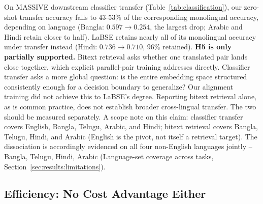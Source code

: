 \documentclass[manuscript]{acmart}
\begin{document}
On MASSIVE downstream classifier transfer (Table~\ref{tab:classification}), our zero-shot transfer accuracy falls to 43-53\% of the corresponding monolingual accuracy, depending on language (Bangla: $0.597\to0.254$, the largest drop; Arabic and Hindi retain closer to half). LaBSE retains nearly all of its monolingual accuracy under transfer instead (Hindi: $0.736\to0.710$, 96\% retained). \textbf{H5 is only partially supported.} Bitext retrieval asks whether one translated pair lands close together, which explicit parallel-pair training addresses directly. Classifier transfer asks a more global question: is the entire embedding space structured consistently enough for a decision boundary to generalize? Our alignment training did not achieve this to LaBSE's degree. Reporting bitext retrieval alone, as is common practice, does not establish broader cross-lingual transfer. The two should be measured separately. A scope note on this claim: classifier transfer covers English, Bangla, Telugu, Arabic, and Hindi; bitext retrieval covers Bangla, Telugu, Hindi, and Arabic (English is the pivot, not itself a retrieval target). The dissociation is accordingly evidenced on all four non-English languages jointly -- Bangla, Telugu, Hindi, Arabic (Language-set coverage across tasks, Section~\ref{sec:results:limitations}).

\subsection{Efficiency: No Cost Advantage Either}
\label{sec:results:efficiency}
\end{document}
